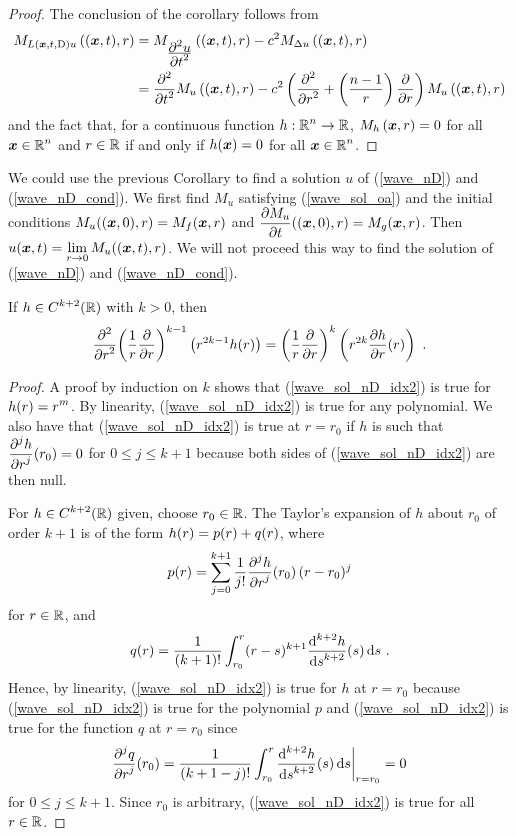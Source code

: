 \begin{proof}
The conclusion of the corollary follows from
\begin{align*}
M_{L(\VEC{x},t,\diff)u}\left((\VEC{x},t), r\right) &=
M_{\pdydxn{u}{t}{2}}\left((\VEC{x},t), r\right)
-c^2  M_{\Delta u} \left((\VEC{x},t), r\right) \\
&= \pdfdxn{M_u\left((\VEC{x},t), r\right)}{t}{2}
- c^2 \left( \pdydxn{}{r}{2} + \left(\frac{n-1}{r}\right) \pdydx{}{r} \right)
M_u\left((\VEC{x},t), r\right)
\end{align*}
and the fact that, for a continuous function
$\DS h:\RR^n\rightarrow \RR$,
$\DS M_h\left(\VEC{x}, r\right) = 0$ for all
$\DS \VEC{x}\in\RR^n$ and $r \in \RR$ if and only if
$h(\VEC{x}) = 0$ for all $\DS \VEC{x}\in\RR^n$.
\end{proof}

\begin{rmk}
We could use the previous Corollary to find a solution $u$ of
(\ref{wave_nD}) and (\ref{wave_nD_cond}).  We first find
$M_u$ satisfying (\ref{wave_sol_oa}) and the initial
conditions $M_u( (\VEC{x},0), r) = M_f(\VEC{x},r)$ and
$\DS \pdydx{M_u}{t}((\VEC{x},0), r) = M_g(\VEC{x},r)$.
Then
$\DS u(\VEC{x},t) = \lim_{r\rightarrow 0} M_u( (\VEC{x},t), r)$.
We will not proceed this way to find the solution of (\ref{wave_nD})
and (\ref{wave_nD_cond}).
\label{wave_sol_limit}
\end{rmk}

\begin{lemma}
If $\DS h \in C^{k+2}(\RR)$ with $k>0$, then
\begin{equation} \label{wave_sol_nD_idx2}
\pdfdxn{\left( \frac{1}{r} \pdydx{}{r}\right)^{k-1}}{r}{2}
\left(r^{2k-1} h(r)\right) = \left(\frac{1}{r} \pdydx{}{r}\right)^k
\left( r^{2k} \pdydx{h}{r}(r)\right) \  .
\end{equation}
\end{lemma}

\begin{proof}
A proof by induction on $k$ shows that (\ref{wave_sol_nD_idx2}) is true for
$\DS h(r) = r^m$.  By linearity, (\ref{wave_sol_nD_idx2}) is true for
any polynomial.  We also have that (\ref{wave_sol_nD_idx2}) is
true at $r=r_0$ if $h$ is such that
$\DS \pdydxn{h}{r}{j}(r_0) = 0$ for $0\leq j \leq k+1$ because
both sides of (\ref{wave_sol_nD_idx2}) are then null.

For $\DS h \in C^{k+2}(\RR)$ given, choose $r_0 \in \RR$.
The Taylor's expansion of $h$ about $r_0$ of order $k+1$ is of
the form $\DS h(r) = p(r) + q(r)$, where
\[
p(r) = \sum_{j=0}^{k+1} \frac{1}{j!}\pdydxn{h}{r}{j}(r_0) \, (r-r_0)^j
\]
for $r \in \RR$, and
\[
q(r) = \frac{1}{(k+1)!} \int_{r_0}^r (r-s)^{k+1} \dydxn{h}{s}{k+2}(s)
\dx{s} \ .
\]
Hence, by linearity, (\ref{wave_sol_nD_idx2}) is true for $h$ at
$r=r_0$ because (\ref{wave_sol_nD_idx2}) is true for the polynomial
$p$ and (\ref{wave_sol_nD_idx2}) is true for the function $q$ at
$r=r_0$ since
\[
\pdydxn{q}{r}{j}(r_0) = \frac{1}{(k+1-j)!} \int_{r_0}^r
\dydxn{h}{s}{k+2}(s) \dx{s}\bigg|_{r=r_0} = 0
\]
for $0\leq j \leq k+1$.  Since $r_0$ is arbitrary,
(\ref{wave_sol_nD_idx2}) is true for all $r\in \RR$.
\end{proof}

